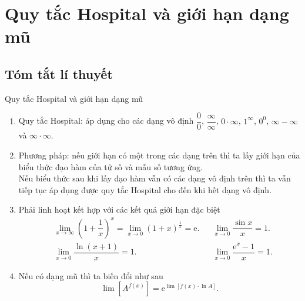 \section{Quy tắc Hospital và giới hạn dạng mũ}
\subsection{Tóm tắt lí thuyết}
\begin{dang}{Quy tắc Hospital và giới hạn dạng mũ}
	\begin{enumerate}
		\item Quy tắc Hospital: áp dụng cho các dạng vô định $ \dfrac{0}{0} $, $ \dfrac{\infty}{\infty} $, $ 0\cdot\infty $, $ 1^{\infty} $, $ 0^{0} $, $ \infty-\infty $ và $ \infty\cdot\infty $.
		\item Phương pháp: nếu giới hạn có một trong các dạng trên thì ta lấy giới hạn của biểu thức đạo hàm của tử số và mẫu số tương ứng.\\
		Nếu biểu thức sau khi lấy đạo hàm vẫn có các dạng vô định trên thì ta vẫn tiếp tục áp dụng được quy tắc Hospital cho đến khi hết dạng vô định.
		\item Phải linh hoạt kết hợp với các kết quả giới hạn đặc biệt
		\[
		\begin{aligned}
		&\lim\limits_{x\to\infty}\left(1+\dfrac{1}{x}\right)^{x}=\lim\limits_{x\to 0}\left(1+x\right)^{\tfrac{1}{x}}=\mathrm{e}.&&\lim\limits_{x\to 0}\dfrac{\sin x}{x}=1.\\
		&\lim\limits_{x\to 0}\dfrac{\ln(x+1)}{x}=1.&&\lim\limits_{x\to 0}\dfrac{\mathrm{e}^{x}-1}{x}=1.
		\end{aligned}
		\]
		\item Nếu có dạng mũ thì ta biến đổi như sau
		\[ 
		\lim \left[A^{f(x)}\right]=\mathrm{e}^{\lim[f(x)\cdot\ln  A]}.
		\]
	\end{enumerate}
\end{dang}
